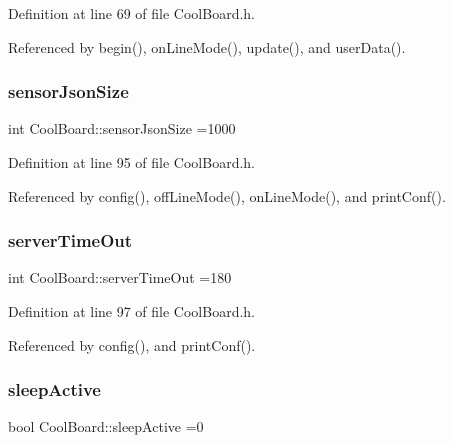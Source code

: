 Definition at line 69 of file Cool\+Board.\+h.



Referenced by begin(), on\+Line\+Mode(), update(), and user\+Data().

\mbox{\label{classCoolBoard_a58e4b6072e3ac8b141ec0befb479208e}} 
\subsubsection{\texorpdfstring{sensor\+Json\+Size}{sensorJsonSize}}
{\footnotesize\ttfamily int Cool\+Board\+::sensor\+Json\+Size =1000\hspace{0.3cm}{\ttfamily [private]}}



Definition at line 95 of file Cool\+Board.\+h.



Referenced by config(), off\+Line\+Mode(), on\+Line\+Mode(), and print\+Conf().

\mbox{\label{classCoolBoard_a7a8d8d3d316220cdd049cd63c1aa8fe6}} 
\subsubsection{\texorpdfstring{server\+Time\+Out}{serverTimeOut}}
{\footnotesize\ttfamily int Cool\+Board\+::server\+Time\+Out =180\hspace{0.3cm}{\ttfamily [private]}}



Definition at line 97 of file Cool\+Board.\+h.



Referenced by config(), and print\+Conf().

\mbox{\label{classCoolBoard_a0a51b2287139f66c738101fb53139230}} 
\subsubsection{\texorpdfstring{sleep\+Active}{sleepActive}}
{\footnotesize\ttfamily bool Cool\+Board\+::sleep\+Active =0\hspace{0.3cm}{\ttfamily [private]}}



